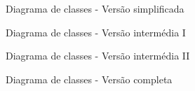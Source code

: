 \begin{figure}[H]
  \centering
  \resizebox{\textwidth}{!}{%
  }
  \caption{Diagrama de classes - Versão simplificada}
  \label{fig:minimalista_v3}
\end{figure}

\begin{figure}[H]
  \centering
  \resizebox{\textwidth}{!}{%
  }
  \caption{Diagrama de classes - Versão intermédia I}
  \label{fig:minimalista_v2}
\end{figure}

\begin{figure}[H]
  \centering
  \resizebox{\textwidth}{!}{%
  }
  \caption{Diagrama de classes - Versão intermédia II}
  \label{fig:minimalista}
\end{figure}

\begin{figure}[H]
  \centering
  \resizebox{\textwidth}{!}{%
  }
  \caption{Diagrama de classes - Versão completa}
  \label{fig:completo}
\end{figure}

